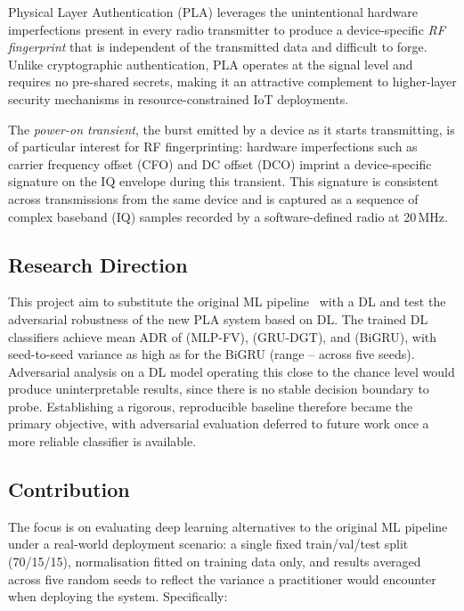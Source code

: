 Physical Layer Authentication (PLA) leverages the unintentional hardware
imperfections present in every radio transmitter to produce a
device-specific \emph{RF fingerprint} that is independent of the transmitted
data and difficult to forge. Unlike cryptographic authentication, PLA operates
at the signal level and requires no pre-shared secrets, making it an attractive
complement to higher-layer security mechanisms in resource-constrained IoT
deployments.

The \emph{power-on transient}, the burst emitted by a device as it starts
transmitting, is of particular interest for RF fingerprinting: hardware imperfections such as carrier frequency offset (CFO) and DC offset (DCO) imprint a device-specific signature on the IQ envelope during this transient. This signature is consistent across transmissions from the same device and is captured as a sequence of complex baseband (IQ) samples recorded by a software-defined radio at 20\,MHz.

\subsection*{Research Direction}
This project aim to substitute the original ML pipeline~\cite{alla2024pla} with a DL and test the adversarial robustness of the new PLA system based on DL. The trained DL classifiers achieve mean ADR of \mlpADR{} (MLP-FV), \gruADR{} (GRU-DGT), and \bigruADR{} (BiGRU), with seed-to-seed variance as high as \bigruSeedADRRange{} for the BiGRU (range \bigruSeedADRMin{}--\bigruSeedADRMax{} across five seeds). 
Adversarial analysis on a DL model operating this close to the chance level would produce uninterpretable results, since there is no stable decision boundary to probe. Establishing a rigorous, reproducible baseline therefore became the primary objective, with adversarial evaluation deferred to future work once a more reliable classifier is available.

\subsection*{Contribution}
The focus is on evaluating deep learning alternatives to the original ML pipeline under a real-world deployment scenario: a single fixed train/val/test split (70/15/15), normalisation fitted on training data only, and results averaged across five random seeds to reflect the variance a practitioner would encounter when deploying the system. Specifically:

